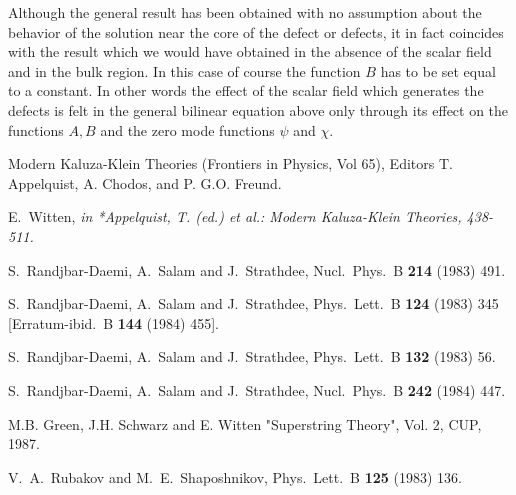 \documentclass[a4paper,12pt]{article}
\begin{document}
\begin{appendix}
Although the general result has been obtained with no assumption
about the behavior of the solution near the core of the defect or
defects, it in fact coincides with the result which we would have
obtained in the absence of the scalar field and in the bulk
region. In this case of course the function $B$ has to be set
equal to a constant. In other words the effect of the scalar field
which generates the defects is felt  in the general bilinear
equation above  only through its effect on the functions $A, B$
and the zero mode functions $\psi$ and $\chi$.


\end{appendix}

\newpage

\begin{thebibliography}{99}

 Modern Kaluza-Klein Theories (Frontiers in Physics, Vol
65), Editors T. Appelquist, A. Chodos, and P. G.O. Freund.

E.~Witten,
{\it  in *Appelquist, T. (ed.) et al.: Modern Kaluza-Klein Theories,
438-511.}

S.~Randjbar-Daemi, A.~Salam and J.~Strathdee,
Nucl.\ Phys.\ B {\bf 214} (1983) 491.

S.~Randjbar-Daemi, A.~Salam and J.~Strathdee,
Phys.\ Lett.\ B {\bf 124} (1983) 345
[Erratum-ibid.\ B {\bf 144} (1984) 455].

S.~Randjbar-Daemi, A.~Salam and J.~Strathdee,
Phys.\ Lett.\ B {\bf 132} (1983) 56.

S.~Randjbar-Daemi, A.~Salam and J.~Strathdee,
Nucl.\ Phys.\ B {\bf 242} (1984) 447.

M.B. Green, J.H. Schwarz and E. Witten
"Superstring Theory", Vol. 2, CUP, 1987.

V.~A.~Rubakov and M.~E.~Shaposhnikov,
Phys.\ Lett.\ B {\bf 125} (1983) 136.


\end{thebibliography}
\end{document}
